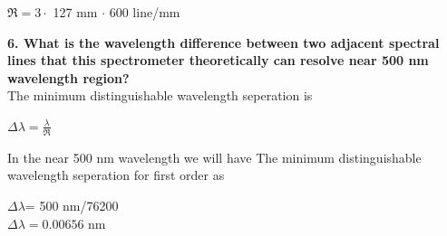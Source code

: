 \documentclass[a4paper,12pt]{report}
\begin{document}
\begin{center}
	$\Re=3\cdot$ 127 mm $\cdot$ 600 line/mm\\
\end{center}
\textbf{6. What is the wavelength difference between two adjacent spectral lines that this spectrometer theoretically can resolve near 500 nm wavelength region?}\\
The minimum distinguishable wavelength seperation is 
\begin{center}
	{\Large $\Delta\lambda=\frac{\lambda}{\Re}$}
\end{center}
In the near 500 nm wavelength we will have The minimum distinguishable wavelength seperation for first order as 
\begin{center}
$\Delta\lambda$= 500 nm/76200\\
$\Delta\lambda=0.00656$ nm
\end{center}
\end{document}
